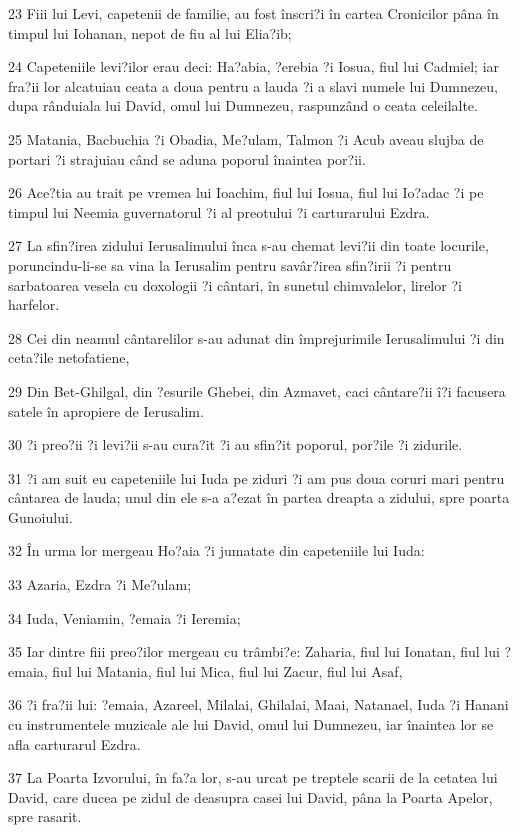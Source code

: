\par 23 Fiii lui Levi, capetenii de familie, au fost înscri?i în cartea Cronicilor pâna în timpul lui Iohanan, nepot de fiu al lui Elia?ib;
\par 24 Capeteniile levi?ilor erau deci: Ha?abia, ?erebia ?i Iosua, fiul lui Cadmiel; iar fra?ii lor alcatuiau ceata a doua pentru a lauda ?i a slavi numele lui Dumnezeu, dupa rânduiala lui David, omul lui Dumnezeu, raspunzând o ceata celeilalte.
\par 25 Matania, Bacbuchia ?i Obadia, Me?ulam, Talmon ?i Acub aveau slujba de portari ?i strajuiau când se aduna poporul înaintea por?ii.
\par 26 Ace?tia au trait pe vremea lui Ioachim, fiul lui Iosua, fiul lui Io?adac ?i pe timpul lui Neemia guvernatorul ?i al preotului ?i carturarului Ezdra.
\par 27 La sfin?irea zidului Ierusalimului înca s-au chemat levi?ii din toate locurile, poruncindu-li-se sa vina la Ierusalim pentru savâr?irea sfin?irii ?i pentru sarbatoarea vesela cu doxologii ?i cântari, în sunetul chimvalelor, lirelor ?i harfelor.
\par 28 Cei din neamul cântarelilor s-au adunat din împrejurimile Ierusalimului ?i din ceta?ile netofatiene,
\par 29 Din Bet-Ghilgal, din ?esurile Ghebei, din Azmavet, caci cântare?ii î?i facusera satele în apropiere de Ierusalim.
\par 30 ?i preo?ii ?i levi?ii s-au cura?it ?i au sfin?it poporul, por?ile ?i zidurile.
\par 31 ?i am suit eu capeteniile lui Iuda pe ziduri ?i am pus doua coruri mari pentru cântarea de lauda; unul din ele s-a a?ezat în partea dreapta a zidului, spre poarta Gunoiului.
\par 32 În urma lor mergeau Ho?aia ?i jumatate din capeteniile lui Iuda:
\par 33 Azaria, Ezdra ?i Me?ulam;
\par 34 Iuda, Veniamin, ?emaia ?i Ieremia;
\par 35 Iar dintre fiii preo?ilor mergeau cu trâmbi?e: Zaharia, fiul lui Ionatan, fiul lui ?emaia, fiul lui Matania, fiul lui Mica, fiul lui Zacur, fiul lui Asaf,
\par 36 ?i fra?ii lui: ?emaia, Azareel, Milalai, Ghilalai, Maai, Natanael, Iuda ?i Hanani cu instrumentele muzicale ale lui David, omul lui Dumnezeu, iar înaintea lor se afla carturarul Ezdra.
\par 37 La Poarta Izvorului, în fa?a lor, s-au urcat pe treptele scarii de la cetatea lui David, care ducea pe zidul de deasupra casei lui David, pâna la Poarta Apelor, spre rasarit.
